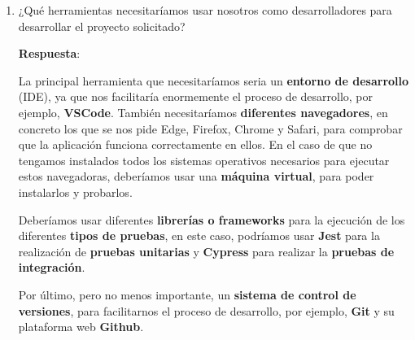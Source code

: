 \begin{enumerate}
     \item ¿Qué herramientas necesitaríamos usar nosotros como desarrolladores para desarrollar el proyecto solicitado?

     \textbf{Respuesta}:

     La principal herramienta que necesitaríamos seria un \textbf{entorno de desarrollo} (IDE), ya que nos facilitaría enormemente el proceso de desarrollo, por ejemplo, \textbf{VSCode}. También necesitaríamos \textbf{diferentes navegadores}, en concreto los que se nos pide Edge, Firefox, Chrome y Safari, para comprobar que la aplicación funciona correctamente en ellos. En el caso de que no tengamos instalados todos los sistemas operativos necesarios para ejecutar estos navegadoras, deberíamos usar una \textbf{máquina virtual}, para poder instalarlos y probarlos.

     Deberíamos usar diferentes \textbf{librerías o frameworks} para la ejecución de los diferentes \textbf{tipos de pruebas}, en este caso, podríamos usar \textbf{Jest} para la realización de \textbf{pruebas unitarias} y \textbf{Cypress} para realizar la \textbf{pruebas de integración}.

     Por último, pero no menos importante, un \textbf{sistema de control de versiones}, para facilitarnos el proceso de desarrollo, por ejemplo, \textbf{Git} y su plataforma web \textbf{Github}.
\end{enumerate}

%
%

